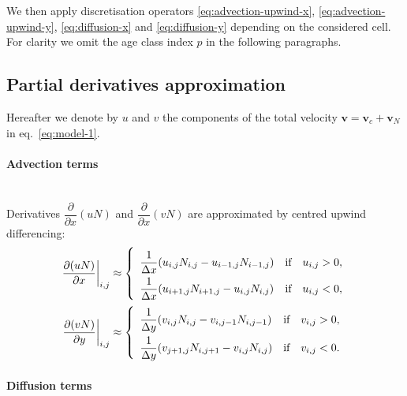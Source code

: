 We then apply discretisation operators \eqref{eq:advection-upwind-x}, \eqref{eq:advection-upwind-y}, \eqref{eq:diffusion-x} and \eqref{eq:diffusion-y} 
depending on the considered cell. For clarity we omit the age class index $p$ in the following paragraphs.

\subsection{Partial derivatives approximation}
\label{sec:ad-derivatives}
\noindent Hereafter we denote by $u$ and $v$ the components of the total velocity 
$\mathbf{v} = \mathbf{v}_c + \mathbf{v}_N$ in eq.~\eqref{eq:model-1}. 

\paragraph{Advection terms}\mbox{} \\

\noindent Derivatives
$\dfrac{\partial}{\partial x}\left( uN \right)$ and 
$\dfrac{\partial}{\partial x}\left( vN \right)$ 
are approximated by centred upwind differencing:
\begin{align}
  \label{eq:advection-upwind-x}
 \left.\dfrac{\partial (uN)}{\partial x}\right|_{i,j} &\approx
 \left\lbrace
   \renewcommand{\arraystretch}{2}
   \begin{array}{lcl}
     \dfrac{1}{\Delta x}(u_{i,j}N_{i,j}-u_{i-1,j}N_{i-1,j}) &
     \mbox{if} & u_{i,j} > 0, \\
     \dfrac{1}{\Delta x}(u_{i+1,j}N_{i+1,j}-u_{i,j}N_{i,j}) &
     \mbox{if} & u_{i,j} < 0, 
   \end{array}
   \right.
   \\
   \label{eq:advection-upwind-y}
   \left.\dfrac{\partial (vN)}{\partial y}\right|_{i,j} &\approx
   \left\lbrace
   \renewcommand{\arraystretch}{2}
   \begin{array}{lcl}
     \dfrac{1}{\Delta y}(v_{i,j}N_{i,j}-v_{i,j-1}N_{i,j-1}) &
     \mbox{if} & v_{i,j} > 0, \\
     \dfrac{1}{\Delta y}(v_{j+1,j}N_{i,j+1}-v_{i,j}N_{i,j}) &
     \mbox{if} & v_{i,j} < 0.
   \end{array}
   \right.
\end{align}

\paragraph{Diffusion terms} \mbox{} \\

